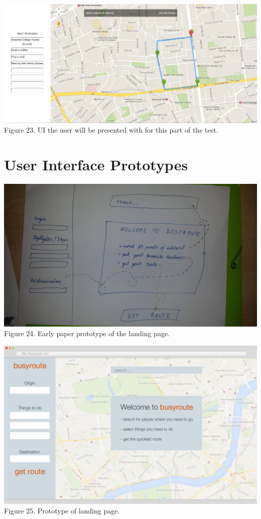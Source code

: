 \documentclass[a4paper, 10pt]{report}
\begin{document}
\begin{appendices}
\begin{center}
\includegraphics[scale=0.3]{hallway_q2.png}\\
Figure 23. UI the user will be presented with for this part of the test.
\end{center}

\chapter{User Interface Prototypes}
\begin{center}
\includegraphics[scale=0.18]{proto_1.png}\\
Figure 24. Early paper prototype of the landing page.
\end{center}

\begin{center}
\includegraphics[scale=0.3]{proto_2.png}\\
Figure 25. Prototype of landing page.
\end{center}


\end{appendices}
\end{document}
